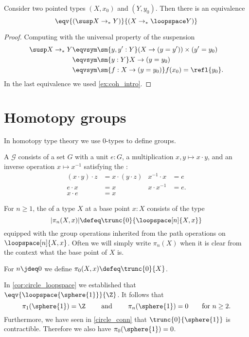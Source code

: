 \begin{thm}
Consider two pointed types $(X,x_0)$ and $(Y,y_0)$. Then there is an equivalence
\begin{equation*}
\eqv{(\susp X \to_\ast Y)}{(X \to_\ast \loopspace Y)}
\end{equation*}
\end{thm}

\begin{proof}
Computing with the universal property of the suspension
\begin{align*}
\susp X \to_\ast Y & \eqvsym \sm{y,y':Y} (X \to (y=y'))\times (y'=y_0) \\
& \eqvsym \sm{y:Y} X\to (y=y_0) \\
& \eqvsym \sm{f:X\to (y=y_0)}f(x_0)=\refl{y_0}.
\end{align*}
In the last equivalence we used \cref{ex:coh_intro}.
\end{proof}

\section{Homotopy groups}
In homotopy type theory we use $0$-types to define groups.
\begin{defn}
A  $\mathcal{G}$ consists of a set $G$ with a unit $e:G$, a multiplication $x,y\mapsto x\cdot y$, and an inverse operation $x\mapsto x^{-1}$ satisfying the :
\begin{align*}
(x\cdot y)\cdot z & =x\cdot(y\cdot z) & x^{-1}\cdot x & = e \\
e\cdot x & = x & x\cdot x^{-1} & = e. \\
x\cdot e & =x
\end{align*}
\end{defn}

\begin{defn}
For $n\geq 1$, the  of a type $X$ at a base point $x:X$ consists of the type
\begin{equation*}
|\pi_n(X,x)| \defeq \trunc{0}{\loopspace[n]{X,x}}
\end{equation*}
equipped with the group operations inherited from the path operations on $\loopspace[n]{X,x}$. 
Often we will simply write $\pi_n(X)$ when it is clear from the context what the base point of $X$ is.

For $n\jdeq 0$ we define $\pi_0(X,x)\defeq \trunc{0}{X}$. 
\end{defn}

\begin{eg}
In \cref{cor:circle_loopspace} we established that $\eqv{\loopspace{\sphere{1}}}{\Z}$. It follows that
\begin{equation*}
\pi_1(\sphere{1})=\Z \qquad\text{ and }\qquad\pi_n(\sphere{1})=0\qquad\text{for $n\geq 2$.}
\end{equation*}
Furthermore, we have seen in \autoref{circle_conn} that $\trunc{0}{\sphere{1}}$ is contractible. 
Therefore we also have $\pi_0(\sphere{1})=0$.
\end{eg}

